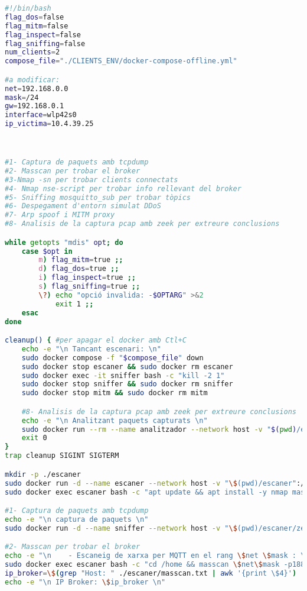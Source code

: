 \begin{lstlisting}[language=bash, caption={Eina automatitzada per a la generació de datasets}, label=lst:tool]
#!/bin/bash
flag_dos=false
flag_mitm=false
flag_inspect=false
flag_sniffing=false
num_clients=2
compose_file="./CLIENTS_ENV/docker-compose-offline.yml"

#a modificar:
net=192.168.0.0
mask=/24
gw=192.168.0.1
interface=wlp42s0
ip_victima=10.4.39.25



#1- Captura de paquets amb tcpdump
#2- Masscan per trobar el broker
#3-Nmap -sn per trobar clients connectats
#4- Nmap nse-script per trobar info rellevant del broker
#5- Sniffing mosquitto_sub per trobar tòpics
#6- Despegament d'entorn simulat DDoS
#7- Arp spoof i MITM proxy
#8- Analisis de la captura pcap amb zeek per extreure conclusions

while getopts "mdis" opt; do
    case $opt in 
        m) flag_mitm=true ;;
        d) flag_dos=true ;;
        i) flag_inspect=true ;;
        s) flag_sniffing=true ;;
        \?) echo "opció invalida: -$OPTARG" >&2
            exit 1 ;;
    esac
done

cleanup() { #per apagar el docker amb Ctl+C
    echo -e "\n Tancant escenari: \n"
    sudo docker compose -f "$compose_file" down
    sudo docker stop escaner && sudo docker rm escaner
    sudo docker exec -it sniffer bash -c "kill -2 1"
    sudo docker stop sniffer && sudo docker rm sniffer
    sudo docker stop mitm && sudo docker rm mitm

    #8- Analisis de la captura pcap amb zeek per extreure conclusions
    echo -e "\n Analitzant paquets capturats \n"
    sudo docker run --rm --name analitzador --network host -v "$(pwd)/escaner":/home zeek/zeek bash -c "cd /home/zeek && zeek -r /home/zeek/capt.pcap"
    exit 0
}
trap cleanup SIGINT SIGTERM

mkdir -p ./escaner
sudo docker run -d --name escaner --network host -v "\$(pwd)/escaner":/home ubuntu:latest sleep infinity #contenidor ubuntu mb interface del host
sudo docker exec escaner bash -c "apt update && apt install -y nmap masscan prips mosquitto-clients"

#1- Captura de paquets amb tcpdump
echo -e "\n captura de paquets \n"
sudo docker run -d --name sniffer --network host -v "\$(pwd)/escaner/zeek":/home ubuntu:latest bash -c "apt update && apt install -y tcpdump && tcpdump -i \$interface -w /home/capt.pcap" #Monitoreig xarxa tcpdump

#2- Masscan per trobar el broker
echo -e "\n    - Escaneig de xarxa per MQTT en el rang \$net \$mask : \n"
sudo docker exec escaner bash -c "cd /home && masscan \$net\$mask -p1883 --rate 1000 -oG masscan.txt" #masscan per trobar el broker via tcp port 1883
ip_broker=\$(grep "Host: " ./escaner/masscan.txt | awk '{print \$4}')
echo -e "\n IP Broker: \$ip_broker \n"


\end{lstlisting}
